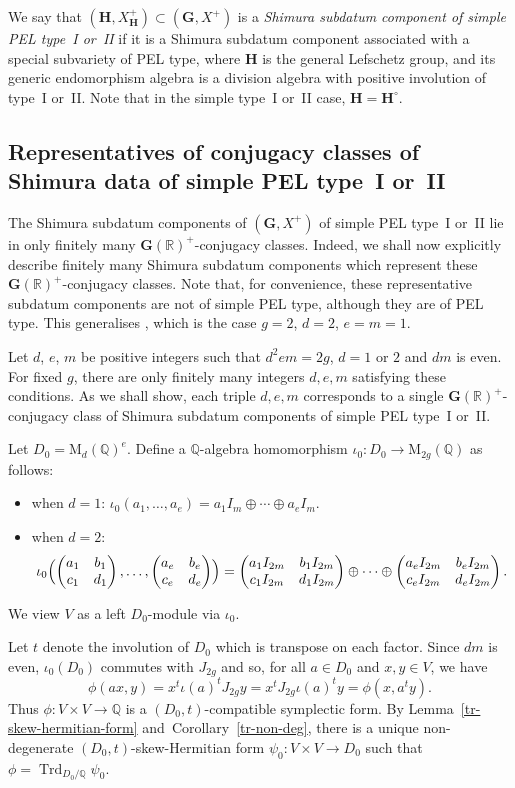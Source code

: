 \documentclass[11pt]{article}
\numberwithin{equation}{section}
\newcommand{\bQ}{\mathbb{Q}}
\newcommand{\bR}{\mathbb{R}}
\newcommand{\gG}{\mathbf{G}}
\newcommand{\gH}{\mathbf{H}}
\newcommand{\rM}{\mathrm{M}}
\DeclareMathOperator{\Trd}{Trd}
\newcommand{\fullmatrix}[4]{\left( \begin{matrix} #1 & #2 \\ #3 & #4 \end{matrix} \right)}
\newcommand{\defterm}[1]{\emph{#1}}
\begin{document}
We say that $(\gH, X_\gH^+) \subset (\gG, X^+)$ is a \defterm{Shimura subdatum component of simple PEL type~I or~II} if it is a Shimura subdatum component associated with a special subvariety of PEL type, where $\gH$ is the general Lefschetz group, and its generic endomorphism algebra is a division algebra with positive involution of type~I or~II.
Note that in the simple type~I or~II case, $\gH = \gH^\circ$.

\subsection{Representatives of conjugacy classes of Shimura data of simple PEL type~I or~II}
\label{subsec:shimura-representatives}

The Shimura subdatum components of $(\gG, X^+)$ of simple PEL type~I or~II lie in only finitely many $\gG(\bR)^+$-conjugacy classes.
Indeed, we shall now explicitly describe finitely many Shimura subdatum components which represent these $\gG(\bR)^+$-conjugacy classes.
Note that, for convenience, these representative subdatum components are not of simple PEL type, although they are of PEL type.
This generalises \cite[Lem.\,6.1]{QRTUI}, which is the case $g=2$, $d=2$, $e=m=1$.

Let $d$, $e$, $m$ be positive integers such that $d^2em = 2g$, $d=1$ or $2$ and $dm$ is even.
For fixed $g$, there are only finitely many integers $d,e,m$ satisfying these conditions.
As we shall show, each triple $d,e,m$ corresponds to a single $\gG(\bR)^+$-conjugacy class of Shimura subdatum components of simple PEL type~I or~II.

Let $D_0 = \rM_d(\bQ)^e$.
Define a $\bQ$-algebra homomorphism $\iota_0 \colon D_0 \to \rM_{2g}(\bQ)$ as follows:
\begin{itemize}
\item when $d=1$:
$\iota_0(a_1, \dotsc, a_e) = a_1 I_m \oplus \dotsb \oplus a_e I_m$.
\item when $d=2$:
\[
\iota_0\Bigl( \fullmatrix{a_1}{b_1}{c_1}{d_1}, \dotsc, \fullmatrix{a_e}{b_e}{c_e}{d_e} \Bigr)
= \fullmatrix{a_1I_{2m}}{b_1I_{2m}}{c_1I_{2m}}{d_1I_{2m}} \oplus \dotsb \oplus \fullmatrix{a_eI_{2m}}{b_eI_{2m}}{c_eI_{2m}}{d_eI_{2m}}.
\]
\end{itemize}
We view $V$ as a left $D_0$-module via $\iota_0$.

Let $t$ denote the involution of $D_0$ which is transpose on each factor.
Since $dm$ is even, $\iota_0(D_0)$ commutes with $J_{2g}$ and so, for all $a \in D_0$ and $x, y \in V$, we have
\[
\phi(ax, y) = x^t \iota(a)^t J_{2g} y = x^t J_{2g} \iota(a)^t y = \phi(x, a^t y).
\]
Thus $\phi \colon V \times V \to \bQ$ is a $(D_0,t)$-compatible symplectic form.
By Lemma~\ref{tr-skew-hermitian-form} and~Corolla\-ry~\ref{tr-non-deg}, there is a unique non-degenerate $(D_0,t)$-skew-Hermitian form $\psi_0 \colon V \times V \to D_0$ such that $\phi = \Trd_{D_0/\bQ} \psi_0$.
\end{document}
